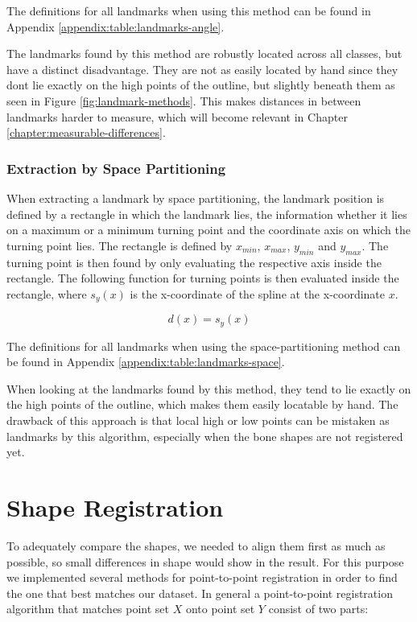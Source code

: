 \documentclass[pdftex,12pt,a4paper]{report}
\begin{document}
The definitions for all landmarks when using this method can be found in Appendix \ref{appendix:table:landmarks-angle}.

The landmarks found by this method are robustly located across all classes, but have a distinct disadvantage. They are
not as easily located by hand since they dont lie exactly on the high points of the outline, but slightly beneath
them  as seen in Figure \ref{fig:landmark-methods}. This makes distances in between landmarks harder to measure, which
will become relevant in Chapter \ref{chapter:measurable-differences}.

\subsubsection{Extraction by Space Partitioning}

When extracting a landmark by space partitioning, the landmark position is defined by a rectangle in which the landmark
lies, the information whether it lies on a maximum or a minimum turning point and the coordinate axis on which the
turning point lies. The rectangle is defined by $x_{min}$, $x_{max}$, $y_{min}$ and $y_{max}$. The turning point
is then found by only evaluating the respective axis inside the rectangle. The following function for turning points
is then evaluated inside the rectangle, where $s_y(x)$ is the x-coordinate of the spline at the x-coordinate $x$.

\begin{equation}
d(x) = s_y(x)
\end{equation}

The definitions for all landmarks when using the space-partitioning method can be found in Appendix
\ref{appendix:table:landmarks-space}.

When looking at the landmarks found by this method, they tend to lie exactly on the high points of the outline, which
makes them easily locatable by hand. The drawback of this approach is that local high or low points can be mistaken as
landmarks by this algorithm, especially when the bone shapes are not registered yet.

\section{Shape Registration}

To adequately compare the shapes, we needed to align them first as much as possible, so small differences in shape would
show in the result. For this purpose we implemented several methods for point-to-point registration in order
to find the one that best matches our dataset. In general a point-to-point registration algorithm that matches point set
$X$ onto point set $Y$ consist of two parts:
\end{document}
